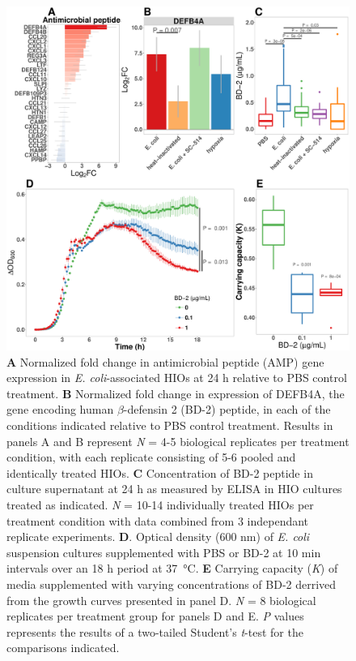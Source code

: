 \documentclass[9pt,lineo]{elife}
\begin{document}
\begin{figure}
\begin{fullwidth}
\centering
\includegraphics[width=0.95\linewidth]{./figures/figure6/figure6_multipanel.pdf}
\caption{\textbf{A} Normalized fold change in antimicrobial peptide (AMP) gene expression in \textit{E. coli}-associated HIOs at 24 h relative to PBS control treatment. \textbf{B} Normalized fold change in expression of DEFB4A, the gene encoding human $\beta$-defensin 2 (BD-2) peptide, in each of the conditions indicated relative to PBS control treatment. Results in panels A and B represent \textit{N} = 4-5 biological replicates per treatment condition, with each replicate consisting of 5-6 pooled and identically treated HIOs. \textbf{C} Concentration of BD-2 peptide in culture supernatant at 24 h as measured by ELISA in HIO cultures treated as indicated. \textit{N} = 10-14 individually treated HIOs per treatment condition with data combined from 3 independant replicate experiments. \textbf{D}. Optical density (600 nm) of \textit{E. coli} suspension cultures supplemented with PBS or BD-2 at 10 min intervals over an 18 h period at \SI{37}{\celsius}. \textbf{E} Carrying capacity (\textit{K}) of media supplemented with varying concentrations of BD-2 derrived from the growth curves presented in panel D. \textit{N} = 8 biological replicates per treatment group for panels D and E. \textit{P} values represents the results of a two-tailed Student's \textit{t}-test for the comparisons indicated.}
\label{fig:fullwidth}
\end{fullwidth}
\end{figure}
\end{document}
